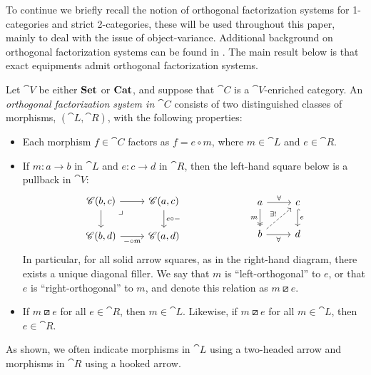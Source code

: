 \documentclass[11pt,oneside,article]{memoir}
\begin{document}
To continue we briefly recall the notion of orthogonal factorization systems for 1-categories and strict 2-categories, these will be used throughout this paper, mainly to deal with the issue of object-variance.  Additional background on orthogonal factorization systems can be found in \cite[Chapter 5.5]{BorceuxV1}.  The main result below is that exact equipments admit orthogonal factorization systems.  
\begin{definition}
      \label{def:orthogonal}
   Let $\cat{V}$ be either $\mathbf{Set}$ or $\mathbf{Cat}$, and suppose that $\cat{C}$ is a $\cat{V}$-enriched
   category. An \emph{orthogonal factorization system in $\cat{C}$} consists of two distinguished
   classes of morphisms, $(\cat{L},\cat{R})$, with the following properties:
   \begin{itemize}
      \item Each morphism $f\in\cat{C}$ factors as $f=e\circ m$, where $m\in\cat{L}$ and
         $e\in\cat{R}$.
      \item If $m\colon a\to b$ in $\cat{L}$ and $e\colon c\to d$ in $\cat{R}$, then the left-hand
         square below is a pullback in $\cat{V}$:
         \begin{equation}
               \label{eqn:OrthFactSys}
            \begin{tikzcd}
               \cat{C}(b,c)\ar[r]\ar[d]\ar[rd,phantom,"\lrcorner" very near start]&\cat{C}(a,c)\ar[d,"e\circ -"]\\
               \cat{C}(b,d)\ar[r,"-\circ m"']&\cat{C}(a,d)
            \end{tikzcd}
            \hspace{.9in}
            \begin{tikzcd}
               a\ar[r,"\forall"]\ar[d,two heads,"m"']&c\ar[d,hook, "e"]\\
               b\ar[r,"\forall"']\ar[ur,dashed,"\exists!"]&d
            \end{tikzcd}
         \end{equation}
         In particular, for all solid arrow squares, as in the right-hand diagram, there exists a
         unique diagonal filler. We say that $m$ is ``left-orthogonal'' to $e$, or that $e$ is
         ``right-orthogonal'' to $m$, and denote this relation as $m\boxslash e$.
      \item If $m\boxslash e$ for all $e\in\cat{R}$, then $m\in\cat{L}$. Likewise, if $m\boxslash e$
         for all $m\in\cat{L}$, then $e\in\cat{R}$.
   \end{itemize}
   As shown, we often indicate morphisms in $\cat{L}$ using a two-headed arrow and morphisms in
   $\cat{R}$ using a hooked arrow.
\end{definition}
\end{document}
